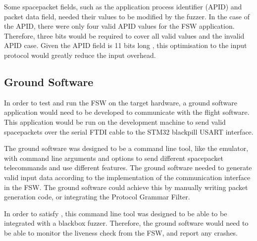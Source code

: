\documentclass[../report.tex]{subfiles}
\begin{document}
Some spacepacket fields, such as the application process identifier (APID) and
packet data field, needed their values to be modified by the fuzzer. In the
case of the APID, there were only four valid APID values for the FSW
application. Therefore, three bits would be required to cover all valid values
and the invalid APID case. Given the APID field is 11 bits long
\citep{Ccsds_spp}, this optimisation to the input protocol would greatly reduce
the input overhead.

\subsection{Ground Software}

In order to test and run the FSW on the target hardware, a ground software
application would need to be developed to communicate with the flight software.
This application would be run on the development machine to send valid
spacepackets over the serial FTDI cable to the STM32 blackpill USART interface.

The ground software was designed to be a command line tool, like the emulator,
with command line arguments and options to send different spacepacket
telecommands and use different features. The ground software needed to generate
valid input data according to the implementation of the communication interface
in the FSW. The ground software could achieve this by manually writing packet
generation code, or integrating the Protocol Grammar Filter.

In order to satisfy , this command line tool was designed to be
able to be integrated with a blackbox fuzzer. Therefore, the ground software
would need to be able to monitor the liveness check from the FSW, and report
any crashes.
\end{document}

